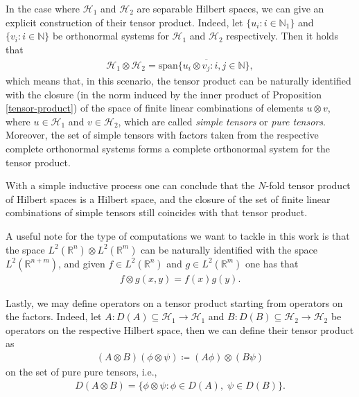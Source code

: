 \begin{appendices}
In the case where $\mathcal{H}_1$ and $\mathcal{H}_2$ are separable Hilbert spaces, we can
give an explicit construction of their tensor product. Indeed, let $\{u_i:i\in\mathbb{N}_1\}$
and $\{v_i:i\in\mathbb{N}\}$ be orthonormal systems for $\mathcal{H}_1$ and $\mathcal{H}_2$
respectively. Then it holds that
\begin{align*}
	\mathcal{H}_1\otimes\mathcal{H}_2 = \overline{
		\mathrm{span}\{u_i\otimes v_j : i,j\in\mathbb{N}\},
	}
\end{align*}
which means that, in this scenario, the tensor product can be naturally identified with the
closure (in the norm induced by the inner product of Proposition \ref{tensor-product}) of the
space of finite linear combinations of elements $u\otimes v$, where $u\in\mathcal{H}_1$ and
$v\in\mathcal{H}_2$, which are called \textit{simple tensors} or \textit{pure tensors}.
Moreover, the set of simple tensors with factors taken from the respective complete
orthonormal systems forms a complete orthonormal system for the tensor product.

\begin{remark}
	With a simple inductive process one can conclude that the $N$-fold tensor product of Hilbert
	spaces is a Hilbert space, and the closure of the set of finite linear combinations of
	simple tensors still coincides with that tensor product.
\end{remark}

\begin{remark}
	A useful note for the type of computations we want to tackle in this work is that the
	space $L^2(\mathbb{R}^n)\otimes L^2(\mathbb{R}^m)$ can be naturally identified with the
	space $L^2(\mathbb{R}^{n+m})$, and given $f\in L^2(\mathbb{R}^n)$ and $g\in L^2(\mathbb{R}^m)$
	one has that
	\begin{align*}
		f \otimes g (x,y) = f(x)g(y).
	\end{align*}
\end{remark}

Lastly, we may define operators on a tensor product starting from operators on the factors.
Indeed, let $A:D(A)\subseteq\mathcal{H}_1\to\mathcal{H}_1$ and $B:D(B)\subseteq\mathcal{H}_2
\to\mathcal{H}_2$ be operators on the respective Hilbert space, then we can define their
tensor product as
\begin{align*}
	(A\otimes B)(\phi\otimes\psi) \coloneq (A\phi)\otimes(B\psi)
\end{align*}
on the set of pure pure tensors, i.e.,
\begin{align*}
	D(A\otimes B) = \{\phi\otimes\psi : \phi\in D(A),\;\psi\in D(B)\}.
\end{align*}


\end{appendices}
